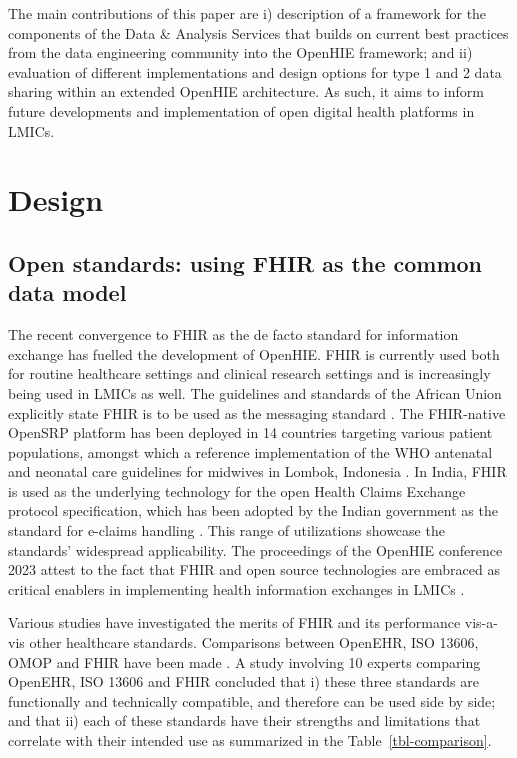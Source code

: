 \documentclass[
  authoryear]{elsarticle}
\begin{document}
The main contributions of this paper are i) description of a framework
for the components of the Data \& Analysis Services that builds on
current best practices from the data engineering community into the
OpenHIE framework; and ii) evaluation of different implementations and
design options for type 1 and 2 data sharing within an extended OpenHIE
architecture. As such, it aims to inform future developments and
implementation of open digital health platforms in LMICs.

\section{Design}\label{design}

\subsection{Open standards: using FHIR as the common data
model}\label{open-standards-using-fhir-as-the-common-data-model}

The recent convergence to FHIR as the de facto standard for information
exchange has fuelled the development of OpenHIE. FHIR is currently used
both for routine healthcare settings \citep{ayaz2021fast} and clinical
research settings \citep{duda2022hl7, vorisek2022fast} and is
increasingly being used in LMICs as well. The guidelines and standards
of the African Union explicitly state FHIR is to be used as the
messaging standard \citep{2023african}. The FHIR-native OpenSRP platform
\citep{mehl2020open} has been deployed in 14 countries targeting various
patient populations, amongst which a reference implementation of the WHO
antenatal and neonatal care guidelines for midwives in Lombok, Indonesia
\citep{summitinstitutefordevelopment2023bunda, kurniawan2019midwife}. In
India, FHIR is used as the underlying technology for the open Health
Claims Exchange protocol specification, which has been adopted by the
Indian government as the standard for e-claims handling \citep{hcx}.
This range of utilizations showcase the standards' widespread
applicability. The proceedings of the OpenHIE conference 2023 attest to
the fact that FHIR and open source technologies are embraced as critical
enablers in implementing health information exchanges in LMICs
\citep{ohie2023unconference}.

Various studies have investigated the merits of FHIR and its performance
vis-a-vis other healthcare standards. Comparisons between OpenEHR, ISO
13606, OMOP and FHIR have been made
\citep{ayaz2023transforming, mullie2023coda, rinaldi2021openehr, cremonesi2023need, sinaci2023data, tsafnat2024converge}.
A study involving 10 experts comparing OpenEHR, ISO 13606 and FHIR
concluded that i) these three standards are functionally and technically
compatible, and therefore can be used side by side; and that ii) each of
these standards have their strengths and limitations that correlate with
their intended use as summarized in the Table~\ref{tbl-comparison}.
\end{document}
